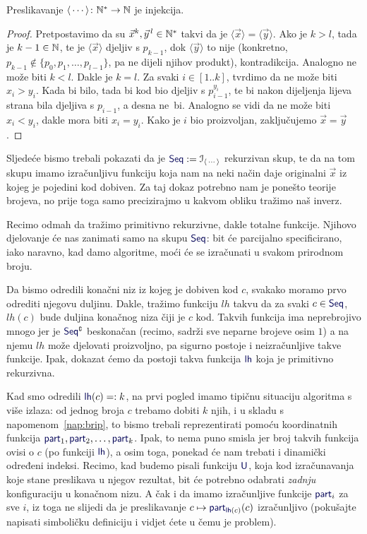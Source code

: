 \begin{propozicija}\label{prop:codeinj}
Preslikavanje $\langle\,\cdots\rangle\colon{\mathbb N}^*\to{\mathbb N}$ je injekcija.
\end{propozicija}
\begin{proof}
    Pretpostavimo da su $\vec x^k,\vec y^{\,l}\in{\mathbb N}^*$ takvi da je $\langle\vec x\rangle=\langle\vec y\rangle$. Ako je $k>l$, tada je $k-1\in{\mathbb N}$, te je $\langle\vec x\rangle$ djeljiv s $p_{k-1}$, dok $\langle\vec y\rangle$ to nije (konkretno, $p_{k-1}\not\in\{p_0,p_1,\dotsc,p_{l-1}\}$, pa ne dijeli njihov produkt), kontradikcija. Analogno ne može biti $k<l$. Dakle je $k=l$. Za svaki $i\in[1..k]$, tvrdimo da ne može biti $x_i>y_i$. Kada bi bilo, tada bi kod bio djeljiv s $p_{i-1}^{y_i}$, te bi nakon dijeljenja lijeva strana bila djeljiva s $p_{i-1}$, a desna ne~bi. Analogno se vidi da ne može biti $x_i<y_i$, dakle mora biti $x_i=y_i$. Kako je $i$ bio proizvoljan, zaključujemo $\vec x=\vec y$.
\end{proof}

Sljedeće bismo trebali pokazati da je $\f{Seq}:=\im{\langle\,\cdots\rangle}$ rekurzivan skup, te da na tom skupu imamo izračunljivu funkciju koja nam na neki način daje originalni $\vec x$ iz kojeg je pojedini kod dobiven. Za taj dokaz potrebno nam je ponešto teorije brojeva, no prije toga samo precizirajmo u kakvom obliku tražimo naš inverz.

Recimo odmah da tražimo primitivno rekurzivne, dakle totalne funkcije. Njihovo djelovanje će nas zanimati samo na skupu $\f{Seq}$: bit će parcijalno specificirano, iako naravno, kad damo algoritme, moći će se izračunati u svakom prirodnom broju.

Da bismo odredili konačni niz iz kojeg je dobiven kod $c$, svakako moramo prvo odrediti njegovu duljinu. Dakle, tražimo funkciju $lh$ takvu da za svaki $c\in\f{Seq}$, $lh(c)$ bude duljina konačnog niza čiji je $c$ kod. Takvih funkcija ima neprebrojivo mnogo jer je $\f{Seq}\kompl$ beskonačan (recimo, sadrži sve neparne brojeve osim $1$) a na njemu $lh$ može djelovati proizvoljno, pa sigurno postoje i neizračunljive takve funkcije. Ipak, dokazat ćemo da postoji takva funkcija $\f{lh}$ koja je primitivno rekurzivna.

Kad smo odredili $\f{lh}(c)=:k$, na prvi pogled imamo tipičnu situaciju algoritma s više izlaza: od jednog broja $c$ trebamo dobiti $k$ njih, i u skladu s napomenom~\ref{nap:brip}, to bismo trebali reprezentirati pomoću koordinatnih funkcija $\f{part}_1,\f{part}_2,\dotsc,\f{part}_k$. Ipak, to nema puno smisla jer broj takvih funkcija ovisi o $c$ (po funkciji $\f{lh}$), a osim toga, ponekad će nam trebati i dinamički određeni indeksi. Recimo, kad budemo pisali funkciju $\f U$, koja kod izračunavanja koje stane preslikava u njegov rezultat, bit će potrebno odabrati \emph{zadnju} konfiguraciju u konačnom nizu. A čak i da imamo izračunljive funkcije $\f{part}_i$ za sve $i$, iz toga ne slijedi da je preslikavanje $c\mapsto\f{part}_{\f{lh}(c)}(c)$ izračunljivo (pokušajte napisati simboličku definiciju i vidjet ćete u čemu je problem).

